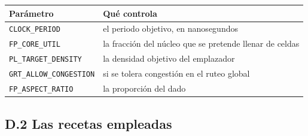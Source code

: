 \begin{longtable}[]{@{}
  >{\raggedright\arraybackslash}p{}
  >{\raggedright\arraybackslash}p{}@{}}
\toprule\noalign{}
\begin{minipage}[b]{\linewidth}\raggedright
Parámetro
\end{minipage} & \begin{minipage}[b]{\linewidth}\raggedright
Qué controla
\end{minipage} \\
\midrule\noalign{}
\endhead
\bottomrule\noalign{}
\endlastfoot
\texttt{CLOCK\_PERIOD} & el periodo objetivo, en nanosegundos \\
\texttt{FP\_CORE\_UTIL} & la fracción del núcleo que se pretende llenar
de celdas \\
\texttt{PL\_TARGET\_DENSITY} & la densidad objetivo del emplazador \\
\texttt{GRT\_ALLOW\_CONGESTION} & si se tolera congestión en el ruteo
global \\
\texttt{FP\_ASPECT\_RATIO} & la proporción del dado \\
\end{longtable}

\subsection{D.2 Las recetas empleadas}\label{d.2-las-recetas-empleadas}

